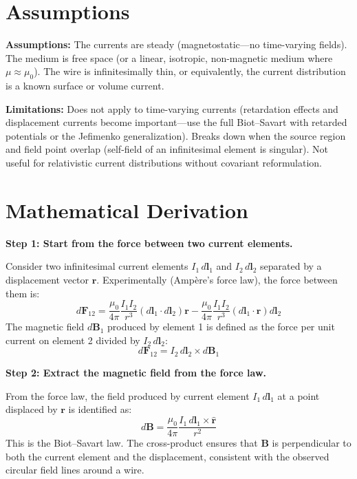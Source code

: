 \section*{Assumptions}

\textbf{Assumptions:} The currents are steady (magnetostatic---no time-varying fields). The medium is free space (or a linear, isotropic, non-magnetic medium where $\mu \approx \mu_0$). The wire is infinitesimally thin, or equivalently, the current distribution is a known surface or volume current.


\textbf{Limitations:} Does not apply to time-varying currents (retardation effects and displacement currents become important---use the full Biot--Savart with retarded potentials or the Jefimenko generalization). Breaks down when the source region and field point overlap (self-field of an infinitesimal element is singular). Not useful for relativistic current distributions without covariant reformulation.


\section*{Mathematical Derivation}

\textbf{Step 1: Start from the force between two current elements.}

Consider two infinitesimal current elements $I_1\,d\mathbf{l}_1$ and $I_2\,d\mathbf{l}_2$ separated by a displacement vector $\mathbf{r}$. Experimentally (Ampère's force law), the force between them is:
\begin{equation}
d\mathbf{F}_{12} = \frac{\mu_0}{4\pi}\frac{I_1 I_2}{r^3}\left(d\mathbf{l}_1\cdot d\mathbf{l}_2\right)\mathbf{r} - \frac{\mu_0}{4\pi}\frac{I_1 I_2}{r^3}\left(d\mathbf{l}_1\cdot\mathbf{r}\right)d\mathbf{l}_2
\end{equation}
The magnetic field $d\mathbf{B}_1$ produced by element 1 is defined as the force per unit current on element 2 divided by $I_2\,d\mathbf{l}_2$:
\begin{equation}
d\mathbf{F}_{12} = I_2\,d\mathbf{l}_2 \times d\mathbf{B}_1
\end{equation}

\textbf{Step 2: Extract the magnetic field from the force law.}

From the force law, the field produced by current element $I_1\,d\mathbf{l}_1$ at a point displaced by $\mathbf{r}$ is identified as:
\begin{equation}
d\mathbf{B} = \frac{\mu_0}{4\pi}\frac{I_1\,d\mathbf{l}_1 \times \hat{\mathbf{r}}}{r^2}
\end{equation}
This is the Biot--Savart law. The cross-product ensures that $\mathbf{B}$ is perpendicular to both the current element and the displacement, consistent with the observed circular field lines around a wire.

